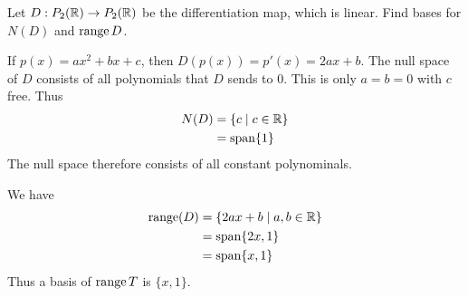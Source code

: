 \documentclass{article}
\DeclareMathOperator{\spn}{span}
\begin{document}
\begin{example}
  Let $D: P_2(\mathbb{R}) \to P_2(\mathbb{R})$ be the differentiation map, which is linear. Find bases for $N(D)$ and $\operatorname{\text{range}} D$.

  If $p(x) = ax^2 + bx + c$, then $D(p(x)) = p'(x) = 2ax + b$. The null space of $D$ consists of all polynomials that $D$ sends to $0$. This is only $a= b = 0$ with $c$ free. Thus
  \begin{align*}
    N(D) &= \{c \mid c \in \R\}\\
    &= \spn \{1\}
  \end{align*}
  The null space therefore consists of all constant polynominals.

  We have
  \begin{align*}
    \range(D) &= \{2ax + b \mid a, b \in \R\}\\
    &= \spn \{2x, 1\}\\
    &= \spn \{x, 1\}\\
  \end{align*}
  Thus a basis of $\operatorname{\text{range}} T$ is $\{x, 1\}$.
\end{example}
\end{document}
